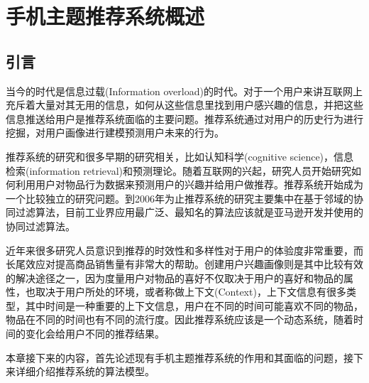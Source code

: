 \chapter{手机主题推荐系统概述}

	\section{引言}
		当今的时代是信息过载(Information overload)的时代\citep{info-overload}。对于一个用户来讲互联网上充斥着大量对其无用的信息，如何从这些信息里找到用户感兴趣的信息，并把这些信息推送给用户是推荐系统面临的主要问题。推荐系统通过对用户的历史行为进行挖掘，对用户画像进行建模预测用户未来的行为。

		推荐系统的研究和很多早期的研究相关，比如认知科学(cognitive science)\citep{cognitive-science}，信息检索(information retrieval)和预测理论\citep{Forecast-principle}。随着互联网的兴起，研究人员开始研究如何利用用户对物品行为数据来预测用户的兴趣并给用户做推荐\citep{cf-sn}。推荐系统开始成为一个比较独立的研究问题。到2006年为止推荐系统的研究主要集中在基于邻域的协同过滤算法，目前工业界应用最广泛、最知名的算法应该就是亚马逊开发并使用的协同过滤算法\citep{Amazon-cf}。

		近年来很多研究人员意识到推荐的时效性和多样性对于用户的体验度非常重要，而长尾效应对提高商品销售量有非常大的帮助。创建用户兴趣画像则是其中比较有效的解决途径之一，因为度量用户对物品的喜好不仅取决于用户的喜好和物品的属性，也取决于用户所处的环境，或者称做上下文(Context)，上下文信息有很多类型，其中时间是一种重要的上下文信息，用户在不同的时间可能喜欢不同的物品，物品在不同的时间也有不同的流行度。因此推荐系统应该是一个动态系统，随着时间的变化会给用户不同的推荐结果\citep{temporal-cf}。

		本章接下来的内容，首先论述现有手机主题推荐系统的作用和其面临的问题，接下来详细介绍推荐系统的算法模型。

